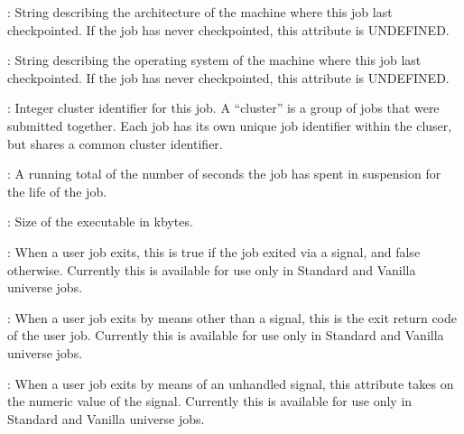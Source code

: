 \begin{description}


\item[\AdAttr{CkptArch}] : String describing the architecture of the machine
where this job last checkpointed.  If the job has never checkpointed,
this attribute is UNDEFINED.

\item[\AdAttr{CkptOpSys}] : String describing the operating system of
the machine where this job last checkpointed.  If the job has never
checkpointed, this attribute is UNDEFINED.

\item[\AdAttr{ClusterId}] : Integer cluster identifier for this job.
A ``cluster'' is a group of jobs that were submitted together.  Each
job has its own unique job identifier within the cluser, but shares a
common cluster identifier.

\item[\AdAttr{CumulativeSuspensionTime}] : A running total of the number of
seconds the job has spent in suspension for the life of the job.

\item[\AdAttr{ExecutableSize}] : Size of the executable in kbytes.

\item[\AdAttr{ExitBySignal}] : When a user job exits, this is true if the
job exited via a signal, and false otherwise. Currently this is available for use only in Standard and Vanilla universe jobs.

\item[\AdAttr{ExitCode}] : When a user job exits by means other than a signal,
this is the exit return code of the user job. Currently this is available for use only in Standard and Vanilla universe jobs.

\item[\AdAttr{ExitSignal}] : When a user job exits by means of an unhandled 
signal, this attribute takes on the numeric value of the signal. Currently this is available for use only in Standard and Vanilla universe jobs.


\end{description}
